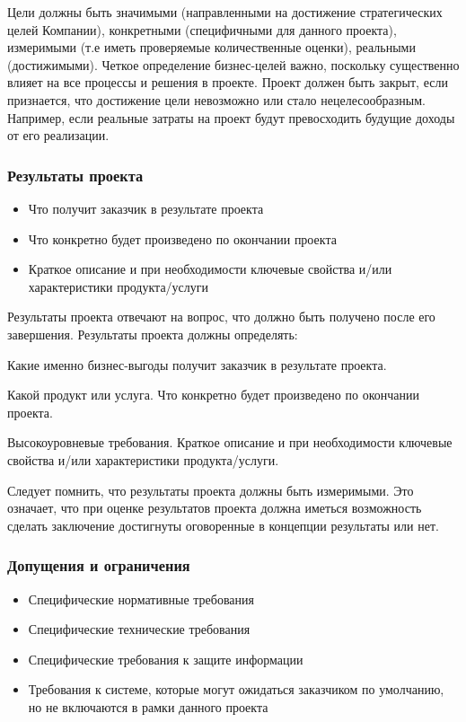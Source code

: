 \documentclass{../industrial-development}
\begin{document}
Цели должны быть значимыми (направленными на достижение стратегических целей Компании), конкретными (специфичными для данного проекта), измеримыми (т.е иметь проверяемые количественные оценки), реальными (достижимыми). Четкое определение бизнес-целей важно, поскольку существенно влияет на все процессы и решения в проекте. Проект должен быть закрыт, если признается, что достижение цели невозможно или стало нецелесообразным. Например, если реальные затраты на проект будут превосходить будущие доходы от его реализации.

    \begin{frame} \frametitle{Результаты проекта}
	\begin{itemize}
		\item Что получит заказчик в результате проекта
		\item Что конкретно будет произведено по окончании проекта
		\item Краткое описание и при необходимости ключевые свойства и/или характеристики продукта/услуги
	\end{itemize}
    \end{frame}
    \lecturenotes

Результаты проекта отвечают на вопрос, что должно быть получено после его завершения. Результаты проекта должны определять:

Какие именно бизнес-выгоды получит заказчик в результате проекта.

Какой продукт или услуга. Что конкретно будет произведено по окончании проекта.

Высокоуровневые требования. Краткое описание и при необходимости ключевые свойства и/или характеристики продукта/услуги.

Следует помнить, что результаты проекта должны быть измеримыми. Это означает, что при оценке результатов проекта должна иметься возможность сделать заключение достигнуты оговоренные в концепции результаты или нет.

    \begin{frame} \frametitle{Допущения и ограничения}
	\begin{itemize}
		\item Специфические нормативные требования
		\item Специфические технические требования
		\item Специфические требования к защите информации
		\item Требования к системе, которые могут ожидаться заказчиком по умолчанию, но не включаются в рамки данного проекта
	\end{itemize}
    \end{frame}
    \lecturenotes
\end{document}
